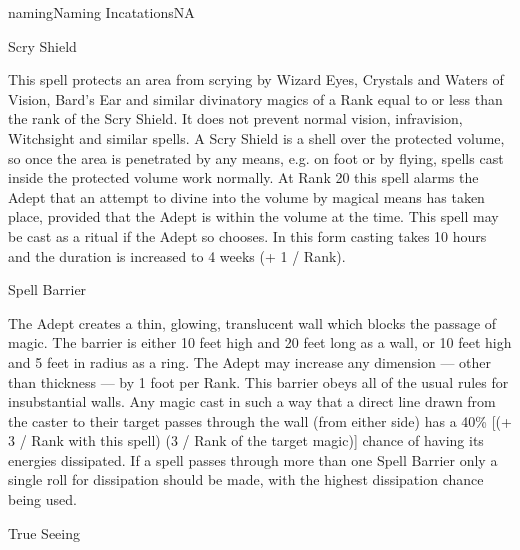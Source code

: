 \begin{College}[2.0]{naming}{Naming Incatations}{NA}
\begin{spell}[S-8]{Scry Shield}
\begin{effects}
This spell protects an area from scrying by Wizard Eyes, Crystals and
Waters of Vision, Bard’s Ear and similar divinatory magics of a Rank
equal to or less than the rank of the Scry Shield. It does not prevent
normal vision, infravision, Witchsight and similar spells.  A Scry
Shield is a shell over the protected volume, so once the area is
penetrated by any means, e.g. on foot or by flying, spells cast inside
the protected volume work normally. At Rank 20 this spell alarms the
Adept that an attempt to divine into the volume by magical means has
taken place, provided that the Adept is within the volume at the time.
This spell may be cast as a ritual if the Adept so chooses. In this
form casting takes 10 hours and the duration is increased to 4 weeks
(+ 1 / Rank).
\end{effects}
\end{spell}

\begin{spell}[S-9]{Spell Barrier}

\begin{effects}
The Adept creates a thin, glowing, translucent wall which blocks the
passage of magic.  The barrier is either 10 feet high and 20 feet long
as a wall, or 10 feet high and 5 feet in radius as a ring.  The Adept
may increase any dimension --- other than thickness --- by 1 foot per
Rank. This barrier obeys all of the usual rules for insubstantial
walls.  Any magic cast in such a way that a direct line drawn from the
caster to their target passes through the wall (from either side) has
a 40\% [(+ 3 / Rank with this spell) (3 / Rank of the target magic)]
chance of having its energies dissipated.  If a spell passes through
more than one Spell Barrier only a single roll for dissipation should
be made, with the highest dissipation chance being used.
\end{effects}
\end{spell}

\begin{spell}[S-10]{True Seeing}


\end{spell}
\end{College}
